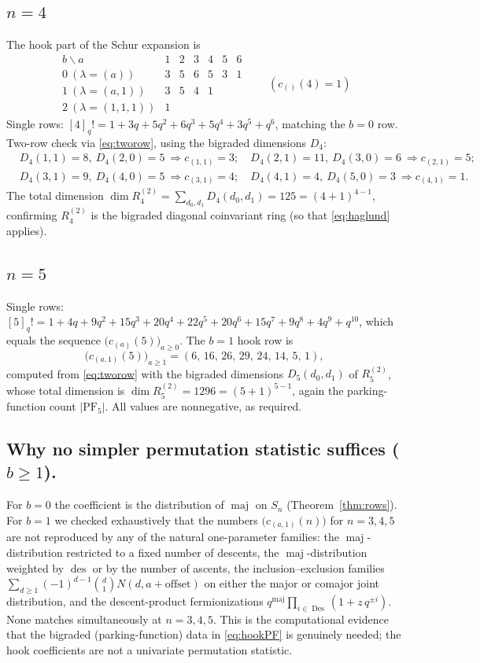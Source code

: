 \documentclass[11pt]{article}
\theoremstyle{definition}
\theoremstyle{remark}
\newcommand{\maj}{\operatorname{maj}}
\newcommand{\des}{\operatorname{des}}
\newcommand{\Des}{\operatorname{Des}}
\newcommand{\PF}{\mathrm{PF}}
\begin{document}
\subsection*{$n=4$}
The hook part of the Schur expansion is
\[
\begin{array}{c|ccccccc}
b\backslash a & 1 & 2 & 3 & 4 & 5 & 6\\\hline
0\ (\lambda=(a)) & 3 & 5 & 6 & 5 & 3 & 1\\
1\ (\lambda=(a,1)) & 3 & 5 & 4 & 1 & &\\
2\ (\lambda=(1,1,1)) & 1 & & & & &
\end{array}
\qquad (c_{()}(4)=1)
\]
Single rows: $[4]_q!=1+3q+5q^2+6q^3+5q^4+3q^5+q^6$, matching the $b=0$ row.
Two-row check via \eqref{eq:tworow}, using the bigraded dimensions $D_4$:
\[
\begin{aligned}
&D_4(1,1)=8,\ D_4(2,0)=5\ \Rightarrow c_{(1,1)}=3;\quad
 D_4(2,1)=11,\ D_4(3,0)=6\ \Rightarrow c_{(2,1)}=5;\\
&D_4(3,1)=9,\ D_4(4,0)=5\ \Rightarrow c_{(3,1)}=4;\quad
 D_4(4,1)=4,\ D_4(5,0)=3\ \Rightarrow c_{(4,1)}=1.
\end{aligned}
\]
The total dimension $\dim R_4^{(2)}=\sum_{d_0,d_1}D_4(d_0,d_1)=125=(4{+}1)^{4-1}$, confirming
$R_4^{(2)}$ is the bigraded diagonal coinvariant ring (so that \eqref{eq:haglund} applies).

\subsection*{$n=5$}
Single rows: $[5]_q!=1+4q+9q^2+15q^3+20q^4+22q^5+20q^6+15q^7+9q^8+4q^9+q^{10}$, which equals the
sequence $\bigl(c_{(a)}(5)\bigr)_{a\ge0}$.  The $b=1$ hook row is
\[
\bigl(c_{(a,1)}(5)\bigr)_{a\ge 1}=(6,\,16,\,26,\,29,\,24,\,14,\,5,\,1),
\]
computed from \eqref{eq:tworow} with the bigraded dimensions $D_5(d_0,d_1)$ of $R_5^{(2)}$,
whose total dimension is $\dim R_5^{(2)}=1296=(5{+}1)^{5-1}$, again the parking-function count
$|\PF_5|$.  All values are nonnegative, as required.

\subsection*{Why no simpler permutation statistic suffices ($b\ge1$).}
For $b=0$ the coefficient is the distribution of $\maj$ on $S_n$ (Theorem~\ref{thm:rows}).  For
$b=1$ we checked exhaustively that the numbers $\bigl(c_{(a,1)}(n)\bigr)$ for $n=3,4,5$ are not
reproduced by any of the natural one-parameter families: the $\maj$-distribution restricted to
a fixed number of descents, the $\maj$-distribution weighted by $\des$ or by the number of
ascents, the inclusion--exclusion families
$\sum_{d\ge1}(-1)^{d-1}\binom{d}{1}N(d,a+\text{offset})$ on either the major or comajor joint
distribution, and the descent-product fermionizations
$q^{\maj}\prod_{i\in\Des}(1+z\,q^{\pm i})$.  None matches simultaneously at $n=3,4,5$.  This is
the computational evidence that the bigraded (parking-function) data in \eqref{eq:hookPF} is
genuinely needed; the hook coefficients are not a univariate permutation statistic.
\end{document}
